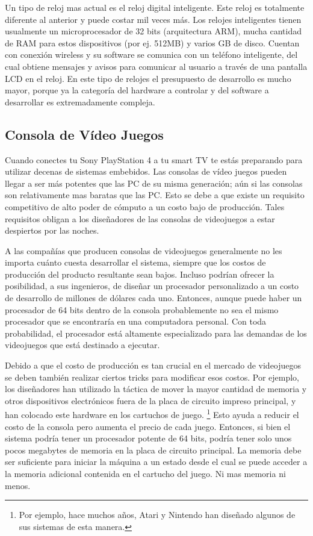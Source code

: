 \documentclass[output=paper, 
colorlinks,
citecolor=brown,
newtxmath
]{langscibook}
\begin{document}
Un tipo de reloj mas actual es el reloj digital inteligente. Este reloj es totalmente
diferente al anterior y puede costar mil veces más. 
Los relojes inteligentes tienen usualmente un microprocesador de 32 bits (arquitectura ARM),
mucha cantidad de RAM para estos dispositivos (por ej. 512MB) y varios
GB de disco. Cuentan con conexión wireless y su software se comunica
con un teléfono inteligente, del cual obtiene mensajes y avisos para comunicar
al usuario a través de una pantalla LCD en el reloj.
En este tipo de relojes el presupuesto de desarrollo es mucho mayor,
porque ya la categoría del hardware a controlar y del software 
a desarrollar es extremadamente compleja.



\subsection {Consola de Vídeo Juegos}

Cuando conectes tu Sony PlayStation 4 a tu smart TV te estás preparando para utilizar decenas de sistemas embebidos.
Las consolas de vídeo juegos pueden llegar a ser más potentes que las PC
de su misma generación; aún si las consolas son relativamente mas baratas que las PC.
Esto se debe a que existe un requisito competitivo de alto poder de cómputo
a un costo bajo de producción. Tales requisitos obligan a los 
diseñadores de las consolas de videojuegos a estar despiertos por las noches.

A las compañías que producen consolas de videojuegos generalmente no les importa 
cuánto cuesta desarrollar el sistema, siempre que los costos de producción del 
producto resultante sean bajos.
Incluso podrían ofrecer la posibilidad, a sus ingenieros, de diseñar un procesador personalizado 
a un costo de desarrollo de millones de dólares cada uno. 
Entonces, aunque puede haber un procesador de 64 bits dentro de la consola 
probablemente no sea el mismo procesador que se encontraría en una 
computadora personal. Con toda probabilidad, el procesador está altamente especializado 
para las demandas de los videojuegos que está destinado a ejecutar.

Debido a que el costo de producción es tan crucial en el mercado de videojuegos 
se deben también realizar ciertos tricks para modificar esos costos. Por ejemplo, los
diseñadores han utilizado la táctica de mover la mayor cantidad de memoria 
y otros dispositivos electrónicos fuera de la 
placa de circuito impreso principal, y han colocado este hardware en los cartuchos de juego. \footnote{Por ejemplo, hace muchos años, Atari y Nintendo 
han diseñado algunos de sus sistemas de esta manera.}
Esto ayuda a reducir el costo de la consola pero aumenta el precio de cada juego. 
Entonces, si bien el sistema podría tener un procesador potente de 64 bits, 
podría tener solo unos pocos megabytes de memoria en la placa de circuito principal. 
La memoria debe ser suficiente para iniciar 
la máquina a un estado desde el cual se puede acceder a la memoria adicional 
contenida en el cartucho del juego. Ni mas memoria ni menos.
\end{document}
